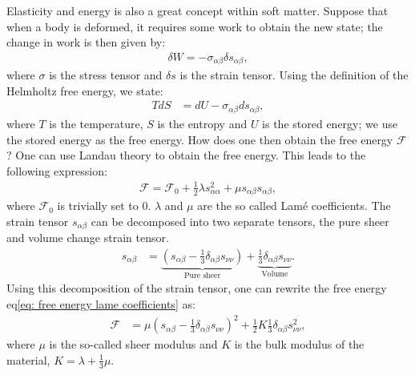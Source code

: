 \documentclass[a4paper]{article}
\newcommand{\f}{\mathcal{F}}
\begin{document}
\vspace*{0.5cm}\noindent
Elasticity and energy is also a great concept within soft matter. Suppose that when a body is deformed, it requires some work to obtain the new state; the change in work is then given by:
\begin{align*}
    \delta W = -\sigma_{\alpha\beta}\delta s_{\alpha\beta},
\end{align*}where $\sigma$ is the stress tensor and $\delta s$ is the strain tensor. Using the definition of the Helmholtz free energy, we state:
\begin{align*}
    TdS &= dU - \sigma_{\alpha\beta}d s_{\alpha\beta},
\end{align*}where $T$ is the temperature, $S$ is the entropy and $U$ is the stored energy; we use the stored energy as the free energy.
How does one then obtain the free energy $\f$? One can use Landau theory to obtain the free energy. This leads to the following expression:
\begin{align}
    \f = \f_0 + \frac{1}{2}\lambda s_{\alpha\alpha}^2 + \mu s_{\alpha\beta}s_{\alpha\beta},\label{eq: free energy lame coefficients}
\end{align}where $\f_0$ is trivially set to $0$. $\lambda$ and $\mu$ are the so called Lamé coefficients.
The strain tensor $s_{\alpha\beta}$ can be decomposed into two separate tensors, the pure sheer and volume change strain tensor. 
\begin{align*}
    s_{\alpha\beta} &= \underbrace{\left(s_{\alpha\beta} - \frac{1}{3}\delta_{\alpha\beta}s_{\nu\nu}\right)}_{\text{Pure sheer}} + \underbrace{\frac{1}{3}\delta_{\alpha\beta}s_{\nu\nu}}_{\text{Volume}}.
\end{align*}Using this decomposition of the strain tensor, one can rewrite the free energy eq\eqref{eq: free energy lame coefficients} as:
\begin{align*}
    \f &= \mu\left(s_{\alpha\beta} - \frac{1}{3}\delta_{\alpha\beta}s_{\nu\nu}\right)^2 + \frac{1}{2}K\frac{1}{3}\delta_{\alpha\beta}s_{\nu\nu}^2,
\end{align*}where $\mu$ is the so-called sheer modulus and $K$ is the bulk modulus of the material, $K = \lambda + \frac{1}{3}\mu$.
\end{document}
